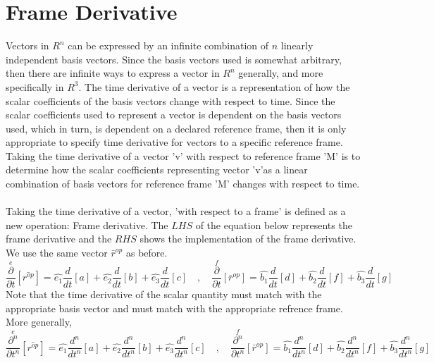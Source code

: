 \section{Frame Derivative}
\begin{comment}
\end{comment}
Vectors in $R^{n}$ can be expressed by an infinite combination of $n$ linearly independent basis vectors. 
Since the basis vectors used is somewhat arbitrary, then there are infinite ways to express a vector in $R^{n}$ generally, and more specifically in $R^{3}$. 
The time derivative of a vector is a representation of how the scalar coefficients of the basis vectors change with respect to time. 
Since the scalar coefficients used to represent a vector is dependent on the basis vectors used, which in turn, is dependent on a declared reference frame, then it is only appropriate to specify time derivative for vectors to a specific reference frame. 
Taking the time derivative of a vector 'v' with respect to reference frame 'M' is to determine how the scalar coefficients representing vector 'v'as a linear combination of basis vectors for reference frame 'M' changes with respect to time.
\\~\\Taking the time derivative of a vector, 'with respect to a frame' is defined as a new operation: Frame derivative. 
The $LHS$ of the equation below represents the frame derivative and the $RHS$ shows the implementation of the frame derivative. 
We use the same vector $\bar{r}^{op}$ as before.
$$\overset{e}{\frac{\partial}{\partial t}}[\bar{{r}^{op}}] = \hat{e_{1}}\frac{d}{d t}[a] + \hat{e_{2}}\frac{d}{d t}[b] + \hat{e_{3}}\frac{d}{d t}[c] \quad,\quad \overset{f}{\frac{\partial}{\partial t}}[\bar{r}^{op}] = \hat{b_{1}}\frac{d}{d t}[d] + \hat{b_{2}}\frac{d}{d t}[f] + \hat{b_{3}}\frac{d}{d t}[g]$$
Note that the time derivative of the scalar quantity must match with the appropriate basis vector and must match with the appropriate refrence frame. 
More generally,
$$\overset{e}{\frac{\partial^n}{\partial t^n}}[\bar{{r}^{op}}] = \hat{e_{1}}\frac{d^n}{d t^n}[a] + \hat{e_{2}}\frac{d^n}{d t^n}[b] + \hat{e_{3}}\frac{d^n}{d t^n}[c] \quad,\quad \overset{f}{\frac{\partial^n}{\partial t^n}}[\bar{r}^{op}] = \hat{b_{1}}\frac{d^n}{d t^n}[d] + \hat{b_{2}}\frac{d^n}{d t^n}[f] + \hat{b_{3}}\frac{d^n}{d t^n}[g]$$




